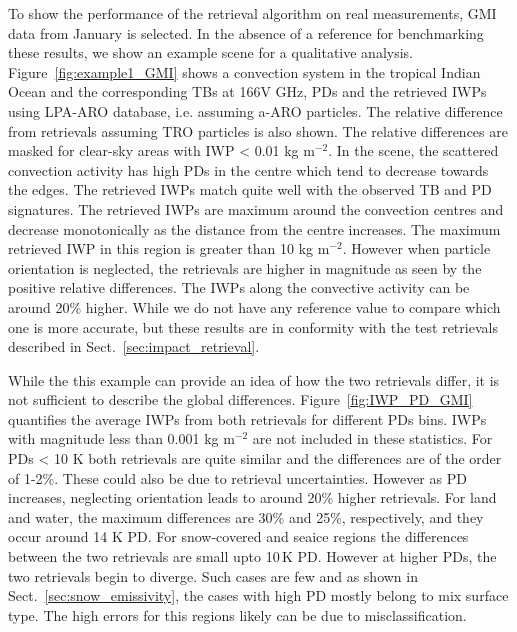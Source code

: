 \documentclass[amt, manuscript]{copernicus}
\begin{document}
To show the performance of the retrieval algorithm on real measurements, GMI data from January is selected. In the absence of a reference for benchmarking these results, we show an example scene for a qualitative analysis. Figure~\ref{fig:example1_GMI} shows a convection system in the tropical Indian Ocean and the corresponding TBs at 166V GHz, PDs and the retrieved IWPs using LPA-ARO database, i.e. assuming a-ARO particles. The relative difference from retrievals assuming TRO particles is also shown. The relative differences are masked for clear-sky areas with IWP < 0.01 kg m$^{-2}$. In the scene, the scattered convection activity has high PDs in the centre which tend to decrease towards the edges. The retrieved IWPs match quite well with the observed TB and PD signatures. The retrieved IWPs are maximum around the convection centres and decrease monotonically as the distance from the centre increases. The maximum retrieved IWP in this region is greater than 10\,\,kg m$^{-2}$. However when particle orientation is neglected, the retrievals are higher in magnitude as seen by the positive relative differences. The IWPs along the convective activity can be around 20\% higher. While we do not have any reference value to compare which one is more accurate, but these results are in conformity with the test retrievals described in  Sect.~\ref{sec:impact_retrieval}.


																																				While the this example can provide an idea of how the two retrievals differ, it is not sufficient to describe the global differences. Figure~\ref{fig:IWP_PD_GMI} quantifies the average IWPs from both retrievals for different PDs bins. IWPs with magnitude less than 0.001\,\,kg m$^{-2}$ are not included in these statistics. For PDs < 10\,\,K both retrievals are quite similar and the differences are of the order of 1-2\%. These could also be due to retrieval uncertainties. However as PD increases, neglecting orientation leads to around 20\% higher retrievals. For land and water, the maximum differences are 30\%  and 25\%, respectively, and they occur around 14\,\,K PD. For snow-covered and seaice regions the differences between the two retrievals are small upto 10\,K PD. However at higher PDs, the two retrievals begin to diverge. Such cases are few and as shown in Sect.~\ref{sec:snow_emissivity}, the cases with high PD mostly belong to mix surface type. The high errors for this regions likely can be due to misclassification.
\end{document}
